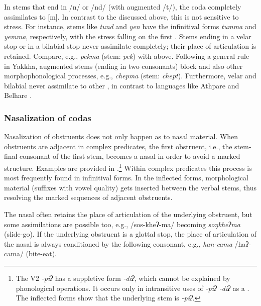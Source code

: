 In stems that end in /n/ or /nd/ (with augmented /t/), the coda completely assimilates to [m]. In contrast to the  discussed above, this  is not sensitive to stress. For instance, stems like \emph{tund}  and \emph{yen}  have the infinitival forms \emph{tumma} and \emph{yemma}, respectively, with the stress falling on the first . Stems ending in a velar stop or in a bilabial stop never assimilate completely; their place of articulation is retained. Compare, e.g., \emph{pekma}  (stem: \emph{pek}) with \Last[b] above. Following a general rule in Yakkha, augmented stems (ending in two consonants) block  and also other morphophonological processes, e.g., \emph{chepma}  (stem: \emph{chept}). Furthermore, velar and bilabial  never assimilate to other , in contrast to languages like Athpare and  Belhare \citep{Ebert1997A-grammar, Bickel2003Belhare}.


\subsubsection{Nasalization of codas}\label{nas-cod}

Nasalization of obstruents does not only happen as  to nasal material. When obstruents are adjacent in complex predicates, the first obstruent, i.e., the stem-final consonant of the first stem, becomes a nasal in order to avoid a marked structure. Examples are provided in  .\footnote{The V2 \emph{-piʔ} has a suppletive form \emph{-diʔ}, which cannot be explained by phonological operations. It occurs only in intransitive uses of \emph{-piʔ \ti -diʔ}  as a . The inflected forms show that the underlying stem is \emph{-piʔ}.} Within complex predicates this process is most frequently found in infinitival forms. In the inflected forms, morphological material (suffixes with vowel quality) gets inserted between the verbal stems, thus resolving the marked sequences of adjacent obstruents.

The nasal often retains the place of articulation of the underlying obstruent, but some assimilations are possible too, e.g., /sos-kheʔ-ma/ becoming \emph{soŋkheʔma}  (slide-go). If the underlying obstruent is a glottal stop, the place of articulation of the nasal is always conditioned by the following consonant, e.g., \emph{han-cama} /haʔ-cama/  (bite-eat). 
\largerpage

